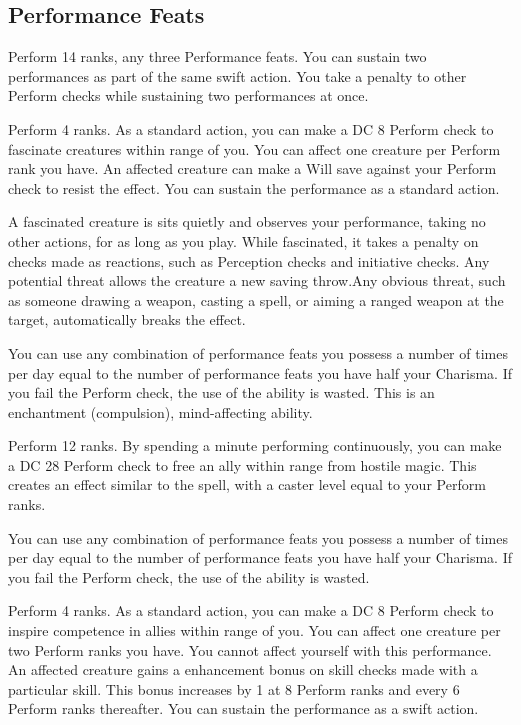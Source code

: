\subsection{Performance Feats}

\featpres Perform 14 ranks, any three Performance feats.
\featben You can sustain two performances as part of the same swift action. You take a  penalty to other Perform checks while sustaining two performances at once.

\featpre Perform 4 ranks.
\featben As a standard action, you can make a DC 8 Perform check to fascinate creatures within \rngmed range of you. You can affect one creature per Perform rank you have. An affected creature can make a Will save against your Perform check to resist the effect. You can sustain the performance as a standard action.

A fascinated creature is sits quietly and observes your performance, taking no other actions, for as long as you play. While fascinated, it takes a  penalty on checks made as reactions, such as Perception checks and initiative checks. Any potential threat allows the creature a new saving throw.Any obvious threat, such as someone drawing a weapon, casting a spell, or aiming a ranged weapon at the target, automatically breaks the effect.

You can use any combination of performance feats you possess a number of times per day equal to the number of performance feats you have \add half your Charisma. If you fail the Perform check, the use of the ability is wasted. This is an enchantment (compulsion), mind-affecting ability.

\featpre Perform 12 ranks.
\featben By spending a minute performing continuously, you can make a DC 28 Perform check to free an ally within \rngmed range from hostile magic. This creates an effect similar to the  spell, with a caster level equal to your Perform ranks.

You can use any combination of performance feats you possess a number of times per day equal to the number of performance feats you have \add half your Charisma. If you fail the Perform check, the use of the ability is wasted.

\featpre Perform 4 ranks.
\featben As a standard action, you can make a DC 8 Perform check to inspire competence in allies within \rngmed range of you. You can affect one creature per two Perform ranks you have. You cannot affect yourself with this performance. An affected creature gains a  enhancement bonus on skill checks made with a particular skill. This bonus increases by 1 at 8 Perform ranks and every 6 Perform ranks thereafter. You can sustain the performance as a swift action.

